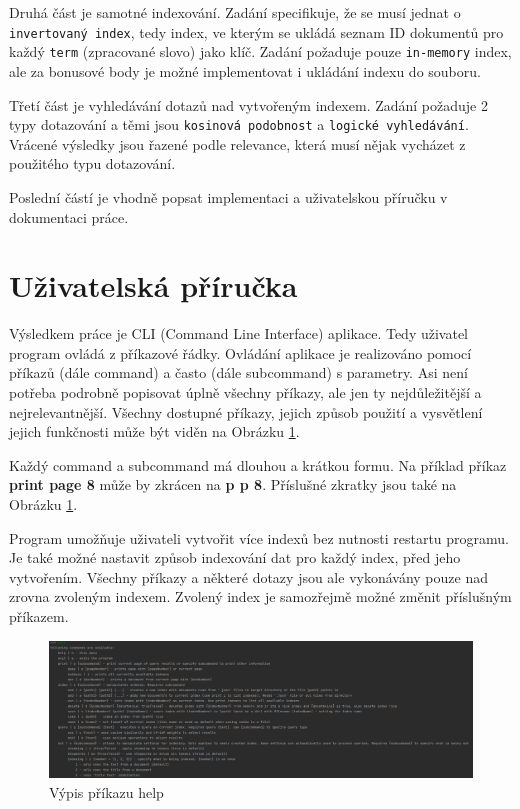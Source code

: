\documentclass[12pt, letterpaper]{article}
\begin{document}
Druhá část je samotné indexování. Zadání specifikuje, že se musí jednat o \texttt{invertovaný index}, tedy index,
ve kterým se ukládá seznam ID dokumentů pro každý \texttt{term} (zpracované slovo) jako klíč. Zadání požaduje pouze
\texttt{in-memory} index, ale za bonusové body je možné implementovat i ukládání indexu do souboru.

Třetí část je vyhledávání dotazů nad vytvořeným indexem. Zadání požaduje 2 typy dotazování a těmi jsou
\texttt{kosinová podobnost} a \texttt{logické vyhledávání}. Vrácené výsledky jsou řazené podle relevance, která
musí nějak vycházet z použitého typu dotazování.

Poslední částí je vhodně popsat implementaci a uživatelskou příručku v dokumentaci práce.
%
\section{Uživatelská příručka}
Výsledkem práce je CLI (Command Line Interface) aplikace. Tedy uživatel program ovládá z příkazové řádky.
Ovládání aplikace je realizováno pomocí příkazů (dále command) a často  (dále subcommand) s parametry.
Asi není potřeba podrobně popisovat úplně všechny příkazy, ale jen ty nejdůležitější a nejrelevantnější. Všechny
dostupné příkazy, jejich způsob použití a vysvětlení jejich funkčnosti může být viděn na Obrázku \ref{fig:help}.

Každý command a subcommand má dlouhou a krátkou formu. Na příklad příkaz \textbf{print page 8} může by zkrácen na
\textbf{p p 8}. Příslušné zkratky jsou také na Obrázku \ref{fig:help}.

Program umožňuje uživateli vytvořit více indexů bez nutnosti restartu programu. Je také možné nastavit způsob
indexování dat pro každý index, před jeho vytvořením. Všechny příkazy a některé dotazy jsou ale vykonávány pouze
nad zrovna zvoleným indexem. Zvolený index je samozřejmě možné změnit příslušným příkazem.

\begin{figure}[H]
    \centering
    \includegraphics[width=\linewidth]{img/help}
    \caption{Výpis příkazu help}
    \label{fig:help}
\end{figure}
%
\end{document}
